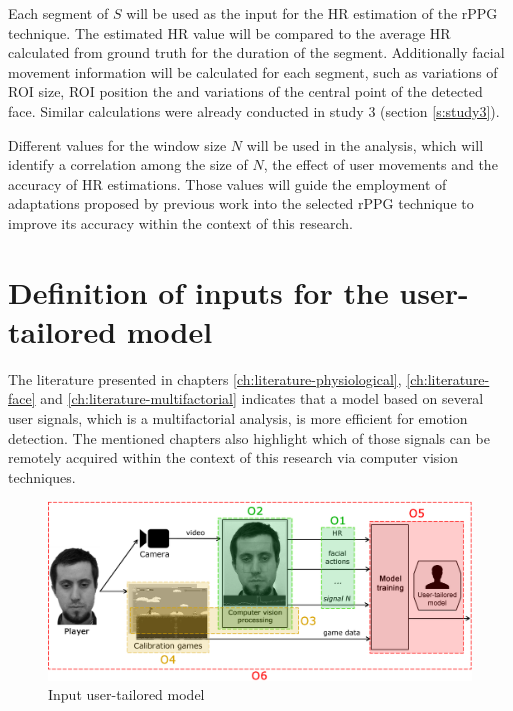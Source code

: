 Each segment of $S$ will be used as the input for the HR estimation of the rPPG technique. The estimated HR value will be compared to the average HR calculated from ground truth for the duration of the segment. Additionally facial movement information will be calculated for each segment, such as variations of ROI size, ROI position the and variations of the central point of the detected face. Similar calculations were already conducted in study 3 (section \ref{s:study3}).

Different values for the window size $N$ will be used in the analysis, which will identify a correlation among the size of $N$, the effect of user movements and the accuracy of HR estimations. Those values will guide the employment of adaptations proposed by previous work \parencite{li2014remote} into the selected rPPG technique to improve its accuracy within the context of this research.

\section{Definition of inputs for the user-tailored model}
\label{sec:closing-definition-inputs}

The literature presented in chapters \ref{ch:literature-physiological}, \ref{ch:literature-face} and \ref{ch:literature-multifactorial} indicates that a model based on several user signals, which is a multifactorial analysis, is more efficient for emotion detection. The mentioned chapters also highlight which of those signals can be remotely acquired within the context of this research via computer vision techniques.

\begin{figure}[h]
    \centering
    \includegraphics[width=\textwidth]{figures/components-objectives.png}
    \caption{Input user-tailored model}
    \label{fig:model-input-definition}
\end{figure}

